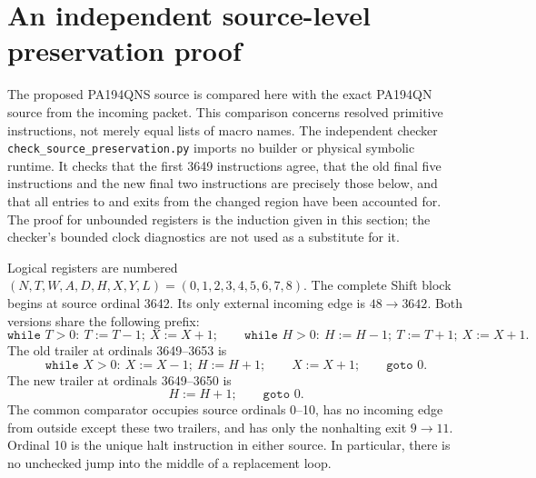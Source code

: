 \section{An independent source-level preservation proof}
\label{sec:source-preservation}

The proposed PA194QNS source is compared here with the exact PA194QN source
from the incoming packet.  This comparison concerns resolved primitive
instructions, not merely equal lists of macro names.  The independent checker
\texttt{check\_source\_preservation.py} imports no builder or physical symbolic
runtime.  It checks that the first 3649 instructions agree, that the old final
five instructions and the new final two instructions are precisely those below,
and that all entries to and exits from the changed region have been accounted
for.  The proof for unbounded registers is the induction given in this section;
the checker's bounded clock diagnostics are not used as a substitute for it.

Logical registers are numbered
$(N,T,W,A,D,H,X,Y,L)=(0,1,2,3,4,5,6,7,8)$.
The complete Shift block begins at source ordinal 3642.
Its only external incoming edge is $48\to3642$.  Both versions share the
following prefix:
\[
 \texttt{while }T>0:\ T:=T-1;\ X:=X+1;
 \qquad
 \texttt{while }H>0:\ H:=H-1;\ T:=T+1;\ X:=X+1.
\]
The old trailer at ordinals 3649--3653 is
\[
 \texttt{while }X>0:\ X:=X-1;\ H:=H+1;
 \qquad X:=X+1;\qquad \texttt{goto }0.
\]
The new trailer at ordinals 3649--3650 is
\[
 H:=H+1;\qquad\texttt{goto }0.
\]
The common comparator occupies source ordinals 0--10, has no incoming edge
from outside except these two trailers, and has only the nonhalting exit
$9\to11$.  Ordinal 10 is the unique halt instruction in either source.
In particular, there is no unchecked jump into the middle of a replacement loop.


